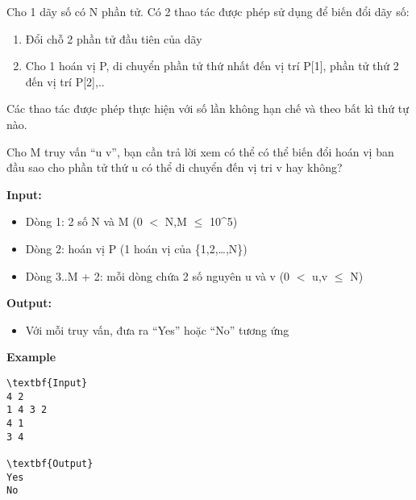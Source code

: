 

Cho 1 dãy số có N phần tử. Có 2 thao tác được phép sử dụng để biến đổi dãy số:
\begin{enumerate}
	\item 

Đổi chỗ 2 phần tử đầu tiên của dãy
	\item 

Cho 1 hoán vị P, di chuyển phần tử thứ nhất đến vị trí P[1], phần tử thứ 2 đến vị trí P[2],..
\end{enumerate}

Các thao tác được phép thực hiện với số lần không hạn chế và theo bất kì thứ tự nào.

Cho M truy vấn “u v”, bạn cần trả lời xem có thể có thể biến đổi hoán vị ban đầu sao cho phần tử thứ u có thể di chuyển đến vị tri v hay không?

\textbf{Input:}
\begin{itemize}
	\item 

Dòng 1: 2 số N và M (0 $<$ N,M  $\le$  10^5)
	\item 

Dòng 2: hoán vị P (1 hoán vị của \{1,2,…,N\})
	\item 

Dòng 3..M + 2: mỗi dòng chứa 2 số nguyên u và v (0 $<$ u,v  $\le$  N)
\end{itemize}

\textbf{Output:}
\begin{itemize}
	\item 

Với mỗi truy vấn, đưa ra “Yes” hoặc “No” tương ứng
\end{itemize}

\textbf{Example}
\begin{verbatim}
\textbf{Input}
4 2
1 4 3 2
4 1
3 4

\textbf{Output}
Yes
No\end{verbatim}

 

 
